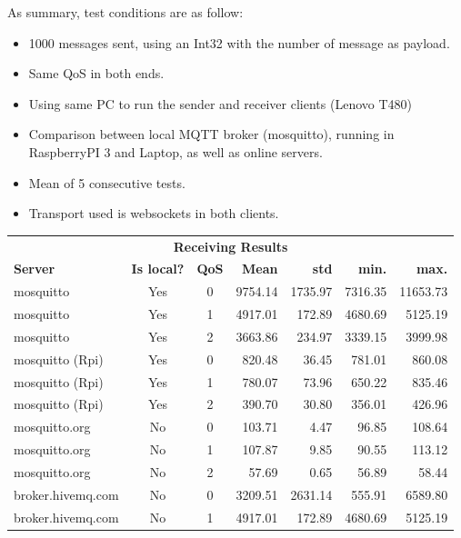 As summary, test conditions are as follow:
\begin{itemize}
	\tightlist
	\item 1000 messages sent, using an Int32 with the number of message as payload.
	\item Same \gls{QoS} in both ends.
	\item Using same PC to run the sender and receiver clients (Lenovo T480)
	\item Comparison between local MQTT broker (mosquitto), running in RaspberryPI 3 and Laptop, as well as online servers.
	\item Mean of 5 consecutive tests.
	\item Transport used is websockets in both clients.
\end{itemize}

\begin{table}
	\centering
	\begin{tabular}{lccrrrr}
		\toprule
		\multicolumn{7}{c}{\textbf{Receiving Results}}\\
		\textbf{Server} & \textbf{Is local?} & \textbf{QoS} & \textbf{Mean} & \textbf{std} & \textbf{min.} & \textbf{max.}\\
		\toprule
		mosquitto         & Yes     &0    & 9754.14        &1735.97 &7316.35 &11653.73  \\
		mosquitto         & Yes     &1    & 4917.01        &172.89  &4680.69 & 5125.19  \\
		mosquitto         & Yes     &2    & 3663.86        &234.97  &3339.15 & 3999.98  \\
		\midrule
		mosquitto (Rpi)   & Yes     &0    & 820.48         &36.45   &781.01  & 860.08   \\
		mosquitto (Rpi)   & Yes     &1    & 780.07         &73.96   &650.22  & 835.46   \\
		mosquitto (Rpi)   & Yes     &2    & 390.70         &30.80   &356.01  & 426.96   \\
		\midrule
		mosquitto.org     & No      &0    & 103.71         & 4.47   & 96.85  & 108.64   \\
		mosquitto.org     & No      &1    & 107.87         & 9.85   & 90.55  & 113.12   \\
		mosquitto.org     & No      &2    & 57.69          & 0.65   & 56.89  & 58.44    \\
		\midrule
		broker.hivemq.com & No      &0    & 3209.51        & 2631.14& 555.91 & 6589.80  \\
		broker.hivemq.com & No      &1    & 4917.01        &172.89  &4680.69 & 5125.19  \\

\end{tabular}
\end{table}
